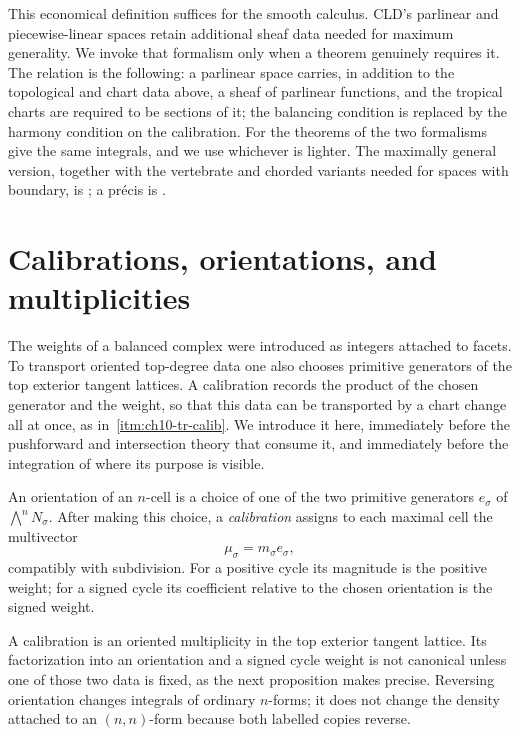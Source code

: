 This economical definition suffices for the smooth calculus. CLD's parlinear
and piecewise-linear spaces retain additional sheaf data needed for maximum
generality. We invoke that formalism only when a theorem genuinely requires
it.  The relation is the following: a parlinear space carries, in addition to
the topological and chart data above, a sheaf of parlinear functions, and the
tropical charts are required to be sections of it; the balancing condition is
replaced by the harmony condition on the calibration.  For the theorems of
 the two formalisms give the
same integrals, and we use whichever is lighter.  The maximally general
version, together with the vertebrate and chorded variants needed for spaces
with boundary, is \cite[\S\S3--6]{CLD25}; a précis is
.

\section{Calibrations, orientations, and multiplicities}
\label{sec:ch10-calibrations}

The weights of a balanced complex were introduced as integers attached to
facets.  To transport oriented top-degree data one also chooses primitive
generators of the top exterior tangent lattices.  A calibration records the
product of the chosen generator and the weight, so that this data can be
transported by a chart change all at once, as in
\,\cref{itm:ch10-tr-calib}.  We introduce
it here, immediately before the pushforward and intersection theory that
consume it, and immediately before the integration of
 where its purpose is visible.

\begin{definition}
\label{def:ch10-calibration}
An orientation of an $n$-cell is a choice of one of the two primitive
generators $e_\sigma$ of $\bigwedge^nN_\sigma$.  After making this choice, a
\emph{calibration} assigns to each maximal cell the multivector
\[
                              \mu_\sigma=m_\sigma e_\sigma,
\]
compatibly with subdivision.  For a positive cycle its magnitude is the
positive weight; for a signed cycle its coefficient relative to the chosen
orientation is the signed weight.
\end{definition}

A calibration is an oriented multiplicity in the top exterior tangent
lattice.  Its factorization into an orientation and a signed cycle weight is
not canonical unless one of those two data is fixed, as the next proposition
makes precise.  Reversing orientation changes integrals of ordinary
$n$-forms; it does not change the density attached to an
$(n,n)$-form because both labelled copies reverse.

